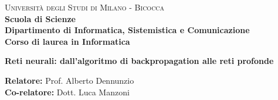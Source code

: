 


    
    \begin{titlepage}
        
        \noindent
        \begin{minipage}[t]{0.19\textwidth}
        \end{minipage}
        \begin{minipage}[t]{0.81\textwidth}
        {
                {\textsc{Università degli Studi di Milano - Bicocca}} \\
                \textbf{Scuola di Scienze} \\
                \textbf{Dipartimento di Informatica, Sistemistica e Comunicazione} \\
                \textbf{Corso di laurea in Informatica} \\
                \par
        }
        \end{minipage}
        
	\vspace{40mm}
        
	\begin{center}
            {\LARGE{
                    \textbf{Reti neurali: dall'algoritmo di backpropagation alle reti profonde}
                    \par
            }}
        \end{center}
        
        \vspace{50mm}

        \noindent
        {\large \textbf{Relatore:} Prof. Alberto Dennunzio } \\

        \noindent
        {\large \textbf{Co-relatore:} Dott. Luca Manzoni}
        
        \vspace{15mm}


\end{titlepage}
